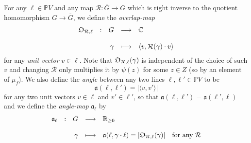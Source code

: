 \documentclass[12pt]{article}
\newcommand{\addwords}[1]{\ \ \ \mbox{#1}}
\newcommand{\bbC}{\ensuremath{\mathbb{C}}}\newcommand{\bbCp}{\ensuremath{\mathbb{C}_p}}
\newcommand{\bbP}{\ensuremath{\mathbb{P}}}
\newcommand{\bbR}{\ensuremath{\mathbb{R}}}
\newcommand{\cR}{\ensuremath{\mathcal{R}}}
\newcommand{\displaymapdef}[5]
{
	\begin{array}{rcrcl}
		#1 &:& #2 &\longrightarrow& #3 \\
		& &    &                    \\
		& & #4 &\longmapsto    & #5
	\end{array}
}
\newcommand{\fa}{\ensuremath{\mathfrak{a}}}
\newcommand{\barG}{\ensuremath{\bar{G}}}
\newcommand{\cAng}{{\frak O}}
\begin{document}
For any $\ell\in\bbP V$ and any map $\cR:\barG\rightarrow G$ which is right inverse to the quotient homomorphism $G\rightarrow \barG$, we define the {\em overlap-map}
\begin{equation}\label{eq:defn of Overlap-Map}
	\displaymapdef{\cAng_{\cR,\ell}}{\barG}{\bbC}{\gamma}{\langle v,\cR(\gamma)\cdot v\rangle}
\end{equation}
for any \textit{unit vector} $v\in\ell$. Note that $\cAng_{\cR,\ell}(\gamma)$ is independent of the choice of such $v$ and changing $\cR$ only multiplies it by $\psi(z)$ for some $z\in Z$ (so by an element of $\mu_f$).
We also define the \textit{angle} between any two lines $\ell,\ell'\in \bbP V$ to be 
$$
\fa(\ell,\ell')=|\langle v,v'\rangle|
$$
for any two unit vectors $v\in\ell$ and $v'\in \ell'$, so that $\fa(\ell,\ell')=\fa(\ell',\ell)$ and we define 
the {\em angle-map } $\fa_\ell$ by 
$$
\displaymapdef{\fa_{\ell}}{\barG}{\bbR_{\geq 0}}{\gamma}{\fa(\ell,\gamma\cdot \ell)
=|\cAng_{\cR,\ell}(\gamma)|\addwords{for any $\cR$}}
$$
\end{document}
